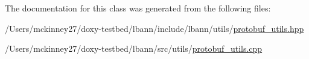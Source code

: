 The documentation for this class was generated from the following files\+:\begin{DoxyCompactItemize}
\item 
/\+Users/mckinney27/doxy-\/testbed/lbann/include/lbann/utils/\hyperlink{protobuf__utils_8hpp}{protobuf\+\_\+utils.\+hpp}\item 
/\+Users/mckinney27/doxy-\/testbed/lbann/src/utils/\hyperlink{protobuf__utils_8cpp}{protobuf\+\_\+utils.\+cpp}\end{DoxyCompactItemize}

